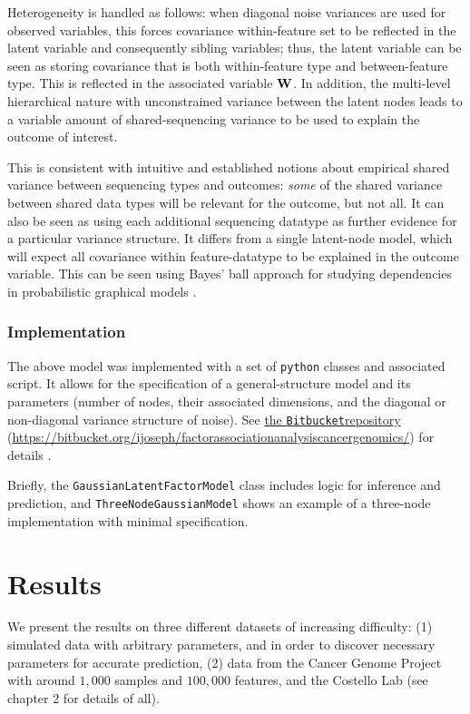 Heterogeneity is handled as follows: when diagonal noise variances are used for observed variables, this forces covariance within-feature set to be reflected in the latent variable and consequently sibling variables; thus, the latent variable can be seen as storing covariance that is both within-feature type and between-feature type. This is reflected in the associated variable $\bold{W}$. In addition, the multi-level hierarchical nature with unconstrained variance between the latent nodes leads to a variable amount of shared-sequencing variance to be used to explain the outcome of interest.

This is consistent with intuitive and established notions about empirical shared variance between sequencing types and outcomes: \textit{some} of the shared variance between shared data types will be relevant for the outcome, but not all. It can also be seen as using each additional sequencing datatype as further evidence for a particular variance structure. It differs from a single latent-node model, which will expect all covariance within feature-datatype to be explained in the outcome variable. This  can be seen using Bayes' ball approach for studying dependencies in probabilistic graphical models .


\subsubsection{Implementation}

The above model was implemented with a set of \texttt{python} classes and associated script. It allows for the specification of a general-structure model and its parameters (number of nodes, their associated dimensions, and the diagonal or non-diagonal variance structure of noise). See \href{https://bitbucket.org/ijoseph/factorassociationanalysiscancergenomics/}{the \texttt{Bitbucket}\reg repository} \\ (\url{https://bitbucket.org/ijoseph/factorassociationanalysiscancergenomics/}) for details .

Briefly, the \texttt{GaussianLatentFactorModel} class includes logic for inference and prediction, and \texttt{ThreeNodeGaussianModel} shows an example of a three-node implementation with minimal specification.

\section{Results}
We present the results on three different datasets of increasing difficulty: (1) simulated data with arbitrary parameters, and in order to discover necessary parameters for accurate prediction, (2) data from the Cancer Genome Project\cite{ledford_end_2015} with around $1,000$ samples and $100,000$ features, and the Costello Lab (see chapter 2 for details of all).

